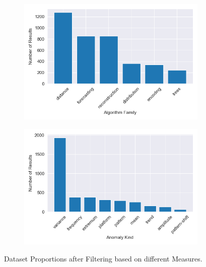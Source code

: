 \begin{figure}
    \centering
    \begin{subfigure}[b]{0.45\textwidth}
        \centering
        \includegraphics[width=\textwidth]{plots/distribution_plots_pie_bar/bar_GutenTAG_tax.png}
        \label{fig:bar_GutenTAG_tax}
    \end{subfigure}
    \hfill
    \begin{subfigure}[b]{0.45\textwidth}
        \centering
        \includegraphics[width=\textwidth]{plots/distribution_plots_pie_bar/bar_GutenTAG_anomaly.png}
        \label{fig:bar_GutenTAG_anomaly}
    \end{subfigure}
   
    \caption{Dataset Proportions after Filtering based on different Measures.}
    \label{fig:GutenTag_dist}
\end{figure}
